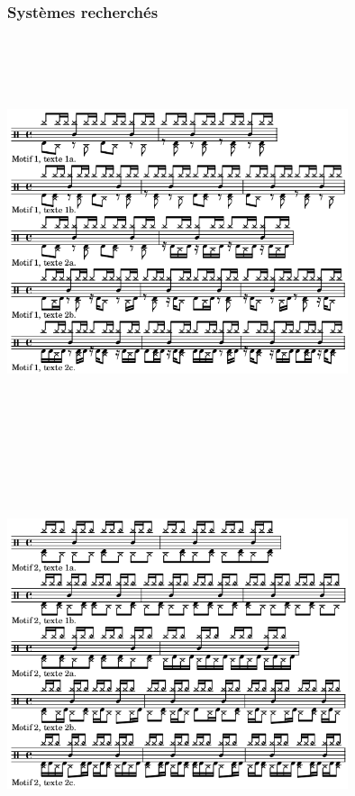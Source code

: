 \subsubsection{Systèmes recherchés}
\includegraphics[height=120mm, width=100mm]{z_images/3_experimentations/experience_1/systeme_recherche_1.png}
\includegraphics[height=120mm, width=100mm]{z_images/3_experimentations/experience_1/systeme_recherche_2.png}

